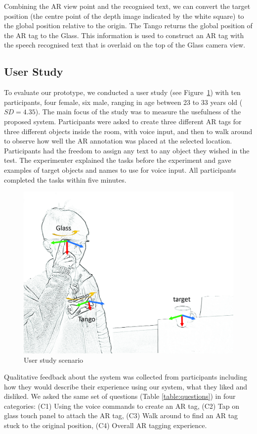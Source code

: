 Combining the AR view point and the recognised text, we can convert the target position (the centre point of the depth image indicated by the white square) to the global position relative to the origin. The Tango returns the global position of the AR tag to the Glass. This information is used to construct an AR tag with the speech recognised text that is overlaid on the top of the Glass camera view.

\subsection{User Study}

To evaluate our prototype, we conducted a user study (see Figure~\ref{fig:mgia15:scenario}) with ten participants, four female, six male, ranging in age between 23 to 33 years old ($SD= 4.35$). The main focus of the study was to measure the usefulness of the proposed system. Participants were asked to create three different AR tags for three different objects inside the room, with voice input, and then to walk around to observe how well the AR annotation was placed at the selected location. Participants had the freedom to assign any text to any object they wished in the test. The experimenter explained the tasks before the experiment and gave examples of target objects and names to use for voice input. All participants completed the tasks within five minutes. 

\begin{figure}[ht]
  \centering
  \includegraphics[width=.8\linewidth]{images/mgia15/axis_lo.jpg}
  \caption{User study scenario}
  \label{fig:mgia15:scenario}
\end{figure}

Qualitative feedback about the system was collected from participants including how they would describe their experience using our system, what they liked and disliked. We asked the same set of questions (Table \ref{table:questions}) in four categories: (C1) Using the voice commands to create an AR tag, (C2) Tap on glass touch panel to attach the AR tag, (C3)  Walk around to find an AR tag stuck to the original position, (C4) Overall AR tagging experience.

